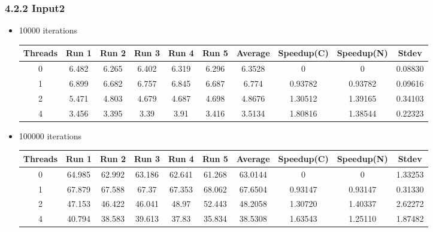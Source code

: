 \documentclass{article}
\begin{document}
\subsubsection*{4.2.2 Input2} 
 \begin{itemize}
\item 10000 iterations
\begin{center}
 \begin{adjustbox}{width=\columnwidth, center} 
 \begin{tabular}{ | |c | c c c c c | c | c c | c | |} \hline 
 Threads & Run 1 & Run 2 & Run 3 & Run 4 & Run 5 & Average & Speedup(C) & Speedup(N) & Stdev \\ [0.5ex] 
 \hline 
 \hline 
0& 6.482 & 6.265 & 6.402 & 6.319 & 6.296 & 6.3528 & 0 & 0 & 0.08830\\ 
 \hline
1& 6.899 & 6.682 & 6.757 & 6.845 & 6.687 & 6.774 & 0.93782 & 0.93782 & 0.09616\\ 
 \hline
2& 5.471 & 4.803 & 4.679 & 4.687 & 4.698 & 4.8676 & 1.30512 & 1.39165 & 0.34103\\ 
 \hline
4& 3.456 & 3.395 & 3.39 & 3.91 & 3.416 & 3.5134 & 1.80816 & 1.38544 & 0.22323\\ 
 \hline
\end{tabular} 
 \end{adjustbox} 
 \end{center} 
\item 100000 iterations
\begin{center}
 \begin{adjustbox}{width=\columnwidth, center} 
 \begin{tabular}{ | |c | c c c c c | c | c c | c | |} \hline 
 Threads & Run 1 & Run 2 & Run 3 & Run 4 & Run 5 & Average & Speedup(C) & Speedup(N) & Stdev \\ [0.5ex] 
 \hline 
 \hline 
0& 64.985 & 62.992 & 63.186 & 62.641 & 61.268 & 63.0144 & 0 & 0 & 1.33253\\ 
 \hline
1& 67.879 & 67.588 & 67.37 & 67.353 & 68.062 & 67.6504 & 0.93147 & 0.93147 & 0.31330\\ 
 \hline
2& 47.153 & 46.422 & 46.041 & 48.97 & 52.443 & 48.2058 & 1.30720 & 1.40337 & 2.62272\\ 
 \hline
4& 40.794 & 38.583 & 39.613 & 37.83 & 35.834 & 38.5308 & 1.63543 & 1.25110 & 1.87482\\ 
 \hline
\end{tabular} 
 \end{adjustbox} 
 \end{center} 
\end{itemize}
\end{document}
